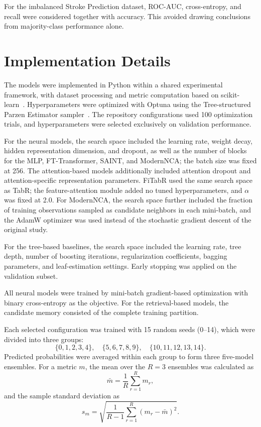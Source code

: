 \documentclass[11pt,a4paper,oneside, openany, reqno, chapter, nokorean]{oblivoir}
\theoremstyle{definition}
\theoremstyle{remark}
\numberwithin{equation}{chapter}
\theoremstyle{definition}
\theoremstyle{remark}
\theoremstyle{definition}
\begin{document}
For the imbalanced Stroke Prediction dataset, ROC-AUC, cross-entropy, and recall were considered together with accuracy. This avoided drawing conclusions from majority-class performance alone.


\section{Implementation Details}
\label{sec:implementation-details}

The models were implemented in Python within a shared experimental framework, with dataset processing and metric computation based on scikit-learn~\cite{sklearn}. Hyperparameters were optimized with Optuna using the Tree-structured Parzen Estimator sampler~\cite{optuna}. The repository configurations used 100 optimization trials, and hyperparameters were selected exclusively on validation performance.

For the neural models, the search space included the learning rate, weight decay, hidden representation dimension, and dropout, as well as the number of blocks for the MLP, FT-Transformer, SAINT, and ModernNCA; the batch size was fixed at 256. The attention-based models additionally included attention dropout and attention-specific representation parameters. FiTabR used the same search space as TabR; the feature-attention module added no tuned hyperparameters, and $\alpha$ was fixed at 2.0. For ModernNCA, the search space further included the fraction of training observations sampled as candidate neighbors in each mini-batch, and the AdamW optimizer was used instead of the stochastic gradient descent of the original study.

For the tree-based baselines, the search space included the learning rate, tree depth, number of boosting iterations, regularization coefficients, bagging parameters, and leaf-estimation settings. Early stopping was applied on the validation subset.

All neural models were trained by mini-batch gradient-based optimization with binary cross-entropy as the objective. For the retrieval-based models, the candidate memory consisted of the complete training partition.

Each selected configuration was trained with 15 random seeds (0--14), which were divided into three groups:
\begin{equation}
\{0,1,2,3,4\},\quad
\{5,6,7,8,9\},\quad
\{10,11,12,13,14\}.
\label{eq:seed-groups}
\end{equation}
Predicted probabilities were averaged within each group to form three five-model ensembles. For a metric $m$, the mean over the $R=3$ ensembles was calculated as
\begin{equation}
\bar{m}=\frac{1}{R}\sum_{r=1}^{R}m_r,
\label{eq:metric-mean}
\end{equation}
and the sample standard deviation as
\begin{equation}
s_m=\sqrt{\frac{1}{R-1}\sum_{r=1}^{R}(m_r-\bar{m})^2}.
\label{eq:metric-std}
\end{equation}
\end{document}
